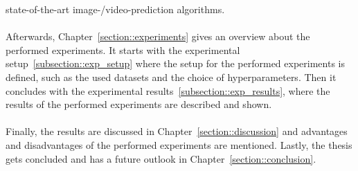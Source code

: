  state-of-the-art image-/video-prediction algorithms.
 \\\\
 Afterwards, Chapter~\ref{section::experiments} gives an overview about the performed experiments. It starts with the experimental 
 setup~\ref{subsection::exp_setup}
 where the setup for the performed experiments is defined, such as the used datasets and the choice of hyperparameters. Then it concludes with the
 experimental results~\ref{subsection::exp_results}, where the results of the performed experiments are described and shown.
 \\\\
 Finally, the results are discussed in Chapter~\ref{section::discussion} and advantages and disadvantages of the performed experiments are mentioned.
 Lastly, the thesis gets concluded and has a future outlook in Chapter~\ref{section::conclusion}.